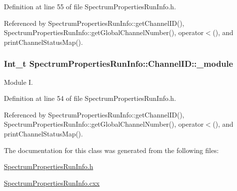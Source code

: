 Definition at line 55 of file Spectrum\-Properties\-Run\-Info.\-h.



Referenced by Spectrum\-Properties\-Run\-Info\-::get\-Channel\-I\-D(), Spectrum\-Properties\-Run\-Info\-::get\-Global\-Channel\-Number(), operator$<$(), and print\-Channel\-Status\-Map().

\hypertarget{class_spectrum_properties_run_info_1_1_channel_i_d_a6f0c9069040d61b614f91152d80e7fa9}{
\subsubsection[{\-\_\-module}]{\setlength{\rightskip}{0pt plus 5cm}Int\-\_\-t Spectrum\-Properties\-Run\-Info\-::\-Channel\-I\-D\-::\-\_\-module}}\label{class_spectrum_properties_run_info_1_1_channel_i_d_a6f0c9069040d61b614f91152d80e7fa9}


Module I. 



Definition at line 54 of file Spectrum\-Properties\-Run\-Info.\-h.



Referenced by Spectrum\-Properties\-Run\-Info\-::get\-Channel\-I\-D(), Spectrum\-Properties\-Run\-Info\-::get\-Global\-Channel\-Number(), operator$<$(), and print\-Channel\-Status\-Map().



The documentation for this class was generated from the following files\-:\begin{DoxyCompactItemize}
\item 
\hyperlink{_spectrum_properties_run_info_8h}{Spectrum\-Properties\-Run\-Info.\-h}\item 
\hyperlink{_spectrum_properties_run_info_8cxx}{Spectrum\-Properties\-Run\-Info.\-cxx}\end{DoxyCompactItemize}

